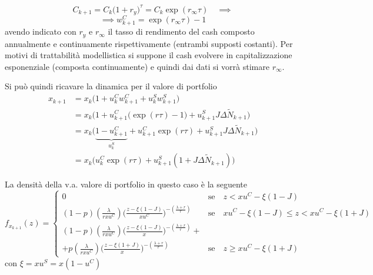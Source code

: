 \documentclass[12pt]{article}
\theoremstyle{break}
\begin{document}
\[
C_{k+1} = C_k \Big(1 + r_y\Big)^{\tau} = C_k\exp(r_{\infty}\tau) \quad \implies
\]
\[
\implies \boxed{w^C_{k+1} = \exp(r_{\infty}\tau) - 1 }
\]
avendo indicato con $r_y$ e $r_{\infty}$ il tasso di rendimento del cash composto annualmente e continuamente rispettivamente (entrambi supposti costanti). Per motivi di trattabilità modellistica si suppone il cash evolvere in capitalizzazione esponenziale (composta continuamente) e quindi dai dati si vorrà stimare $ r_{\infty}$.

Si può quindi ricavare la dinamica per il valore di portfolio
\begin{align*}
x_{k+1} & = x_k\Big( 1 + u^C_k w^C_{k+1} + u^S_k w^S_{k+1}\Big)\\
& = x_k\Big(1 + u^C_{k+1} \big(\exp({r\tau}) -1\big) + u^S_{k+1}J\Delta \widetilde{N}_{k+1}\Big)\\
& = x_k \Big(\underbrace{1 - u^C_{k+1}}_{u^S_k} + u^C_{k+1} \exp({r\tau}) +  u^S_{k+1}J\Delta \widetilde{N}_{k+1}\Big) \\
& = x_k \Big(u^C_k\exp({r\tau}) +  u^S_{k+1}(1 + J\Delta \widetilde{N}_{k+1})\Big)
\end{align*}

La densità della v.a. valore di portfolio in questo caso è la seguente
\begin{equation}
f_{x_{k+1}}(z) = 
\begin{cases}
0 & \text{se} \quad z < x u^C - \xi(1-J)\\
(1-p)(\frac{\lambda}{r xu^C})\Big(\frac{z-\xi(1-J)}{xu^C}\Big)^{-(\frac{\lambda+r}{r})} & \text{se} \quad x u^C - \xi(1-J) \leq z < x u^C - \xi(1+J) \\
(1-p)(\frac{\lambda}{r xu^C})\Big(\frac{z-\xi(1-J)}{x}\Big)^{-(\frac{\lambda+r}{r})}+\\ + p(\frac{\lambda}{r xu^C})\Big(\frac{z-\xi(1+J)}{x}\Big)^{-(\frac{\lambda+r}{r})} & \text{se} \quad z \geq x u^C - \xi(1+J)
\end{cases}
\end{equation}
con $\xi = xu^S = x(1-u^C)$
\end{document}
